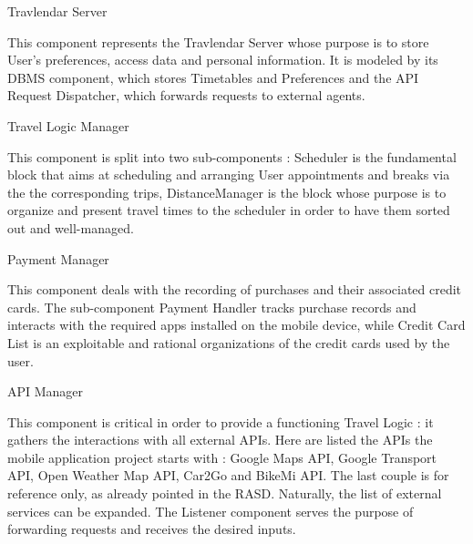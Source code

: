Travlendar Server

This component represents the Travlendar Server whose  purpose is to store User's preferences, access data and personal information. It is modeled by its DBMS component, which stores Timetables and Preferences and the API Request Dispatcher, which forwards requests to external agents.

Travel Logic Manager

This component is split into two sub-components : Scheduler is the fundamental block that aims at scheduling and arranging User appointments and breaks via the the corresponding trips, DistanceManager is the block whose purpose is to organize and present travel times to the scheduler in order to have them sorted out and well-managed.


Payment Manager

This component deals with the recording of purchases and their associated credit cards.
The sub-component Payment Handler tracks purchase records and interacts with the required apps installed on the mobile device, while Credit Card List is an exploitable and rational organizations of the credit cards used by the user.

API Manager

This component is critical in order to provide a functioning Travel Logic : it gathers the interactions with all external APIs. Here are listed the APIs the mobile application project starts with : Google Maps API, Google Transport API, Open Weather Map API, Car2Go and BikeMi API. The last couple is for reference only, as already pointed in the RASD. Naturally, the list of external services can be expanded.
The Listener component serves the purpose of forwarding requests and receives the desired inputs.




